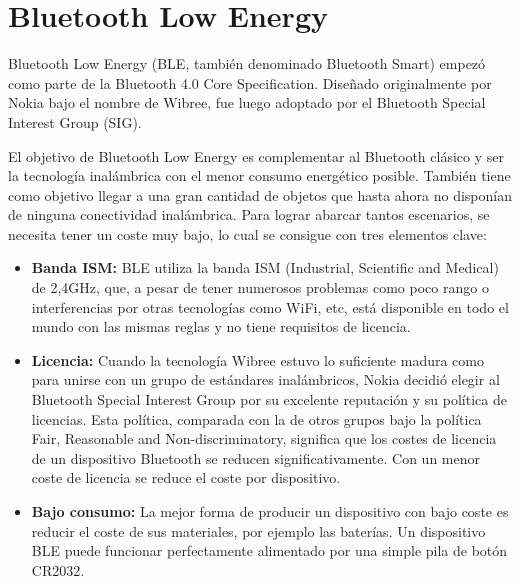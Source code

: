 
\cleardoublepage


\chapter{Bluetooth Low Energy}
\label{makereference2}

Bluetooth Low Energy (BLE, también denominado Bluetooth Smart) empezó como parte de la Bluetooth 4.0 Core Specification. Diseñado originalmente por Nokia bajo el nombre de Wibree, fue luego adoptado por el Bluetooth Special Interest Group (SIG).~\cite{BLE:Townsend:2014}~\cite{BLE:Heydon:2012}~\cite{bluetoothCS}

El objetivo de Bluetooth Low Energy es complementar al Bluetooth clásico y ser la tecnología inalámbrica con el menor consumo energético posible. También tiene como objetivo llegar a una gran cantidad de objetos que hasta ahora no disponían de ninguna conectividad inalámbrica. Para lograr abarcar tantos escenarios, se necesita tener un coste muy bajo, lo cual se consigue con tres elementos clave:

\begin{itemize}

	\item \textbf{Banda ISM:} BLE utiliza la banda ISM (Industrial, Scientific and Medical) de 2,4GHz, que, a pesar de tener numerosos problemas como poco rango o interferencias por otras tecnologías como WiFi, etc, está disponible en todo el mundo con las mismas reglas y no tiene requisitos de licencia.

	\item \textbf{Licencia:} Cuando la tecnología Wibree estuvo lo suficiente madura como para unirse con un grupo de estándares inalámbricos, Nokia decidió elegir al Bluetooth Special Interest Group por su excelente reputación y su política de licencias. Esta política, comparada con la de otros grupos bajo la política Fair, Reasonable and Non-discriminatory, significa que los costes de licencia de un dispositivo Bluetooth se reducen significativamente. Con un menor coste de licencia se reduce el coste por dispositivo.

	\item \textbf{Bajo consumo:} La mejor forma de producir un dispositivo con bajo coste es reducir el coste de sus materiales, por ejemplo las baterías. Un dispositivo BLE puede funcionar perfectamente alimentado por una simple pila de botón CR2032.

\end{itemize}

